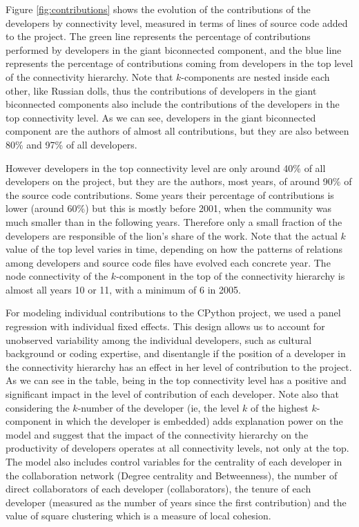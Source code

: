 Figure \ref{fig:contributions} shows the evolution of the contributions of the developers by connectivity level, measured in terms of lines of source code added to the project. The green line represents the percentage of contributions performed by developers in the giant biconnected component, and the blue line represents the percentage of contributions coming from developers in the top level of the connectivity hierarchy. Note that $k$-components are nested inside each other, like Russian dolls, thus the contributions of developers in the giant biconnected components also include the contributions of the developers in the top connectivity level. As we can see, developers in the giant biconnected component are the authors of almost all contributions, but they are also between 80\% and 97\% of all developers.

However developers in the top connectivity level are only around 40\% of all developers on the project, but they are the authors, most years, of around 90\% of the source code contributions. Some years their percentage of contributions is lower (around 60\%) but this is mostly before 2001, when the community was much smaller than in the following years. Therefore only a small fraction of the developers are responsible of the lion's share of the work. Note that the actual $k$ value of the top level varies in time, depending on how the patterns of relations among developers and source code files have evolved each concrete year. The node connectivity of the $k$-component in the top of the connectivity hierarchy is almost all years 10 or 11, with a minimum of 6 in 2005.

For modeling individual contributions to the CPython project, we used  a panel regression with individual fixed effects. This design allows us to account for unobserved variability among the individual developers, such as cultural background or coding expertise, and disentangle if the position of a developer in the connectivity hierarchy has an effect in her level of contribution to the project. As we can see in the table, being in the top connectivity level has a positive and significant impact in the level of contribution of each developer. Note also that considering the $k$-number of the developer (ie, the level $k$ of the highest $k$-component in which the developer is embedded) adds explanation power on the model and suggest that the impact of the connectivity hierarchy on the productivity of developers operates at all connectivity levels, not only at the top. The model also includes control variables for the centrality of each developer in the collaboration network (Degree centrality and Betweenness), the number of direct collaborators of each developer (collaborators), the tenure of each developer (measured as the number of years since the first contribution) and the value of square clustering which is a measure of local cohesion.

